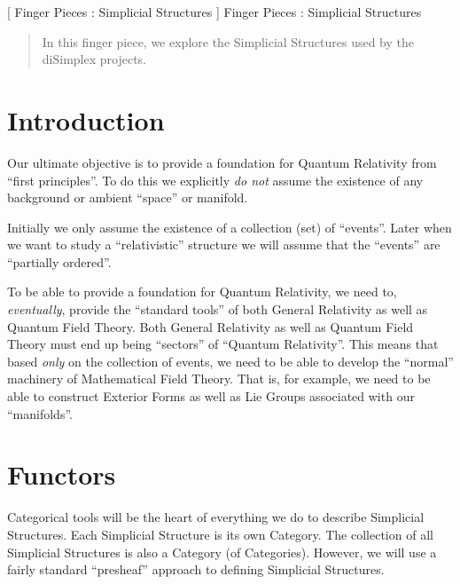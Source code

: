 
[
  Finger Pieces : Simplicial Structures
]{
  Finger Pieces : Simplicial Structures
}
\author{Stephen Gaito}

\maketitle

\begin{abstract}
  In this finger piece, we explore the Simplicial Structures used by the
  diSimplex projects.
\end{abstract}


\section*{Introduction}

Our ultimate objective is to provide a foundation for Quantum Relativity from
``first principles''. To do this we explicitly \emph{do not} assume the
existence of any background or ambient ``space'' or manifold.

Initially we only assume the existence of a collection (set) of ``events''.
Later when we want to study a ``relativistic'' structure we will assume that
the ``events'' are ``partially ordered''.

To be able to provide a foundation for Quantum Relativity, we need to,
\emph{eventually}, provide the ``standard tools'' of both General Relativity as
well as Quantum Field Theory. Both General Relativity as well as Quantum Field
Theory must end up being ``sectors'' of ``Quantum Relativity''. This means that
based \emph{only} on the collection of events, we need to be able to develop the
``normal'' machinery of Mathematical Field Theory. That is, for example, we need
to be able to construct Exterior Forms as well as Lie Groups associated with our
``manifolds''.

\section*{Functors} 

Categorical tools will be the heart of everything we do to describe Simplicial
Structures. Each Simplicial Structure is its own Category. The collection of all
Simplicial Structures is also a Category (of Categories). However, we will use a
fairly standard ``presheaf'' approach to defining Simplicial Structures. 

